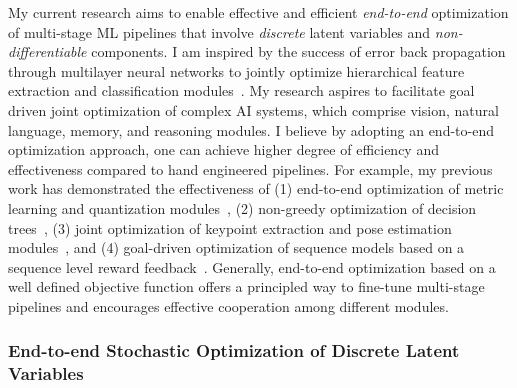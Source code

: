 \documentclass[a4paper, 10pt]{article}
\def\eg{{\em e.g.,}}
\newcommand{\figref}[1]{Figure~\ref{#1}}
\begin{document}

My current research aims to enable effective and efficient {\em
  end-to-end} optimization of multi-stage ML pipelines that involve {\em
  discrete} latent variables and {\em non-differentiable} components.
I am inspired by the success of error back propagation through
multilayer neural networks to jointly optimize hierarchical feature
extraction and classification modules~\cite{backprop,lecun98}.  My
research aspires to facilitate goal driven joint optimization of
complex AI systems, which comprise vision, natural language, memory,
and reasoning modules. I believe by adopting an end-to-end
optimization approach, one can achieve higher degree of efficiency and
effectiveness compared to hand engineered pipelines.  For example, my
previous work has demonstrated the effectiveness of (1) end-to-end
optimization of metric learning and quantization
modules~\cite{mlh,hdml}, (2) non-greedy optimization of decision
trees~\cite{engodt}, (3) joint optimization of keypoint extraction and
pose estimation modules~\cite{keypointnet}, and (4) goal-driven
optimization of sequence models based on a sequence level reward
feedback~\cite{mapo,ocd}. Generally, end-to-end optimization based on
a well defined objective function offers a principled way to fine-tune
multi-stage pipelines and encourages effective cooperation among
different modules.

\vspace*{-.2cm}
\subsubsection*{End-to-end Stochastic Optimization of Discrete Latent Variables}
\vspace*{-.1cm}
\end{document}
